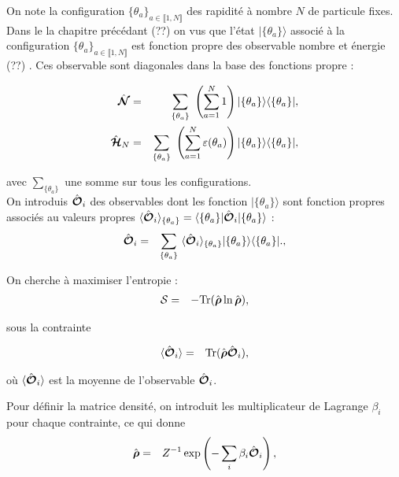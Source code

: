 On note la configuration $\{ \theta_a \}_{a\in \llbracket 1 , N \rrbracket}$ des rapidité à nombre $N$ de particule fixes. Dans le la chapitre précédant (??) on vus que l'état $\vert \{ \theta_a \} \rangle$ associé à la configuration $\{ \theta_a \}_{a\in \llbracket 1 , N \rrbracket}$ est fonction propre des observable nombre et énergie (??) . Ces observable sont diagonales dans la base des fonctions propre :

\begin{eqnarray}
	\operator{\mathcal{N}} & = & \sum_{ \{\theta_a\} }   \left ( \sum_{a = 1}^N  1 \right )  \vert \{ \theta_a\}\rangle	\langle \{ \theta_a \}\vert,\\
	\operator{\mathcal{H}}_N & = & \sum_{\{ \theta_a\}}  \left ( \sum_{a = 1}^N  \varepsilon ( \theta_a ) \right )   \vert \{ \theta_a\}\rangle	\langle \{ \theta_a \}\vert,		
\end{eqnarray}

avec $ \sum_{\{ \theta_a\}}$ une somme sur tous les configurations.\\

On introduis $\hat{\bm{\mathcal{O}}}_i$ des observables dont les fonction  $\vert \{ \theta_a \} \rangle$  sont fonction propres associés au valeurs propres $\langle \hat{\bm{\mathcal{O}}}_i \rangle_{\{\theta_a \}} = \langle \{ \theta_a \} \vert\hat{\bm{\mathcal{O}}}_i \vert \{ \theta_a \} \rangle$ :\\

\begin{eqnarray}
	\operator{\mathcal{O}}_i & = & \sum_{ \{\theta_a\} }   \langle \operator{\mathcal{O}}_i \rangle_{\{\theta_a \}}  \vert \{ \theta_a\}\rangle	\langle \{ \theta_a \}\vert.,		
\end{eqnarray}

On cherche à maximiser l'entropie :
\begin{eqnarray}
	\mathcal{S} & = & -\mathrm{Tr} ( \hat{\bm{\rho}} \ln \hat{\bm{\rho}} ) , 	
\end{eqnarray}

sous la contrainte 

\begin{eqnarray}
	\langle \hat{\bm{\mathcal{O}}}_i \rangle & = & 	\mathrm{Tr} ( \hat{\bm{\rho}} \hat{\bm{\mathcal{O}}}_i ) ,
\end{eqnarray}

où $\langle \hat{\bm{\mathcal{O}}}_i \rangle$ est la moyenne de l'observable $\hat{\bm{\mathcal{O}}}_i$.

Pour définir la matrice densité, on introduit les multiplicateur de Lagrange $\beta_i$ pour chaque contrainte, ce qui donne  
\begin{eqnarray}
	 \hat{\bm{\rho}} &= & Z^{-1} \exp \left ( - \sum_i \beta_i \hat{\bm{\mathcal{O}}}_i \right ) , 		
\end{eqnarray}

